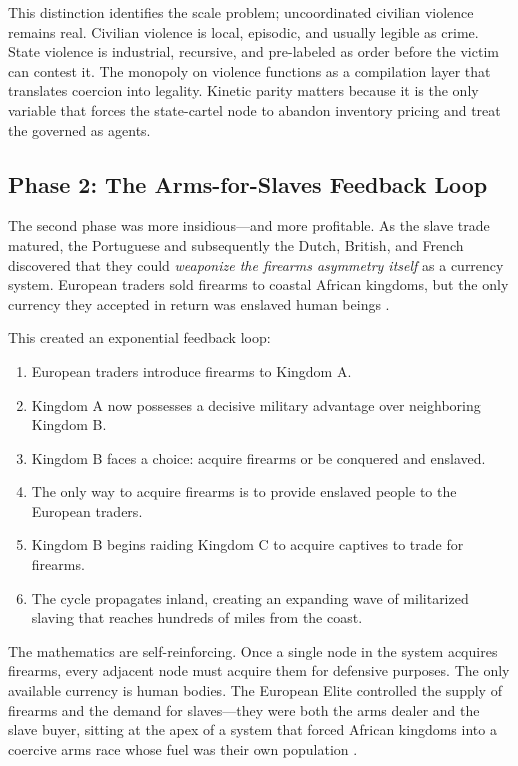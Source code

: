 This distinction identifies the scale problem; uncoordinated civilian violence remains real. Civilian violence is local, episodic, and usually legible as crime. State violence is industrial, recursive, and pre-labeled as order before the victim can contest it. The monopoly on violence functions as a compilation layer that translates coercion into legality. Kinetic parity matters because it is the only variable that forces the state-cartel node to abandon inventory pricing and treat the governed as agents.

\subsection{Phase 2: The Arms-for-Slaves Feedback Loop}

The second phase was more insidious---and more profitable. As the slave trade matured, the Portuguese and subsequently the Dutch, British, and French discovered that they could \textit{weaponize the firearms asymmetry itself} as a currency system. European traders sold firearms to coastal African kingdoms, but the only currency they accepted in return was enslaved human beings \cite{inikori}.

This created an exponential feedback loop:

\begin{enumerate}
    \item European traders introduce firearms to Kingdom A.
    \item Kingdom A now possesses a decisive military advantage over neighboring Kingdom B.
    \item Kingdom B faces a choice: acquire firearms or be conquered and enslaved.
    \item The only way to acquire firearms is to provide enslaved people to the European traders.
    \item Kingdom B begins raiding Kingdom C to acquire captives to trade for firearms.
    \item The cycle propagates inland, creating an expanding wave of militarized slaving that reaches hundreds of miles from the coast.
\end{enumerate}

The mathematics are self-reinforcing. Once a single node in the system acquires firearms, every adjacent node must acquire them for defensive purposes. The only available currency is human bodies. The European Elite controlled the supply of firearms and the demand for slaves---they were both the arms dealer and the slave buyer, sitting at the apex of a system that forced African kingdoms into a coercive arms race whose fuel was their own population \cite{whatley2018}.

